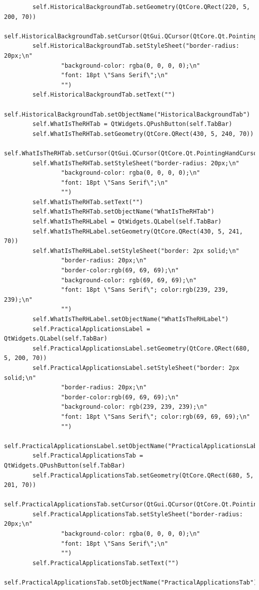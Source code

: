 \documentclass{article}
\begin{document}
\begin{lstlisting}
        self.HistoricalBackgroundTab.setGeometry(QtCore.QRect(220, 5, 200, 70))
        self.HistoricalBackgroundTab.setCursor(QtGui.QCursor(QtCore.Qt.PointingHandCursor))
        self.HistoricalBackgroundTab.setStyleSheet("border-radius: 20px;\n"
                "background-color: rgba(0, 0, 0, 0);\n"
                "font: 18pt \"Sans Serif\";\n"
                "")
        self.HistoricalBackgroundTab.setText("")
        self.HistoricalBackgroundTab.setObjectName("HistoricalBackgroundTab")
        self.WhatIsTheRHTab = QtWidgets.QPushButton(self.TabBar)
        self.WhatIsTheRHTab.setGeometry(QtCore.QRect(430, 5, 240, 70))
        self.WhatIsTheRHTab.setCursor(QtGui.QCursor(QtCore.Qt.PointingHandCursor))
        self.WhatIsTheRHTab.setStyleSheet("border-radius: 20px;\n"
                "background-color: rgba(0, 0, 0, 0);\n"
                "font: 18pt \"Sans Serif\";\n"
                "")
        self.WhatIsTheRHTab.setText("")
        self.WhatIsTheRHTab.setObjectName("WhatIsTheRHTab")
        self.WhatIsTheRHLabel = QtWidgets.QLabel(self.TabBar)
        self.WhatIsTheRHLabel.setGeometry(QtCore.QRect(430, 5, 241, 70))
        self.WhatIsTheRHLabel.setStyleSheet("border: 2px solid;\n"
                "border-radius: 20px;\n"
                "border-color:rgb(69, 69, 69);\n"
                "background-color: rgb(69, 69, 69);\n"
                "font: 18pt \"Sans Serif\"; color:rgb(239, 239, 239);\n"
                "")
        self.WhatIsTheRHLabel.setObjectName("WhatIsTheRHLabel")
        self.PracticalApplicationsLabel = QtWidgets.QLabel(self.TabBar)
        self.PracticalApplicationsLabel.setGeometry(QtCore.QRect(680, 5, 200, 70))
        self.PracticalApplicationsLabel.setStyleSheet("border: 2px solid;\n"
                "border-radius: 20px;\n"
                "border-color:rgb(69, 69, 69);\n"
                "background-color: rgb(239, 239, 239);\n"
                "font: 18pt \"Sans Serif\"; color:rgb(69, 69, 69);\n"
                "")
        self.PracticalApplicationsLabel.setObjectName("PracticalApplicationsLabel")
        self.PracticalApplicationsTab = QtWidgets.QPushButton(self.TabBar)
        self.PracticalApplicationsTab.setGeometry(QtCore.QRect(680, 5, 201, 70))
        self.PracticalApplicationsTab.setCursor(QtGui.QCursor(QtCore.Qt.PointingHandCursor))
        self.PracticalApplicationsTab.setStyleSheet("border-radius: 20px;\n"
                "background-color: rgba(0, 0, 0, 0);\n"
                "font: 18pt \"Sans Serif\";\n"
                "")
        self.PracticalApplicationsTab.setText("")
        self.PracticalApplicationsTab.setObjectName("PracticalApplicationsTab")

\end{lstlisting}
\end{document}
